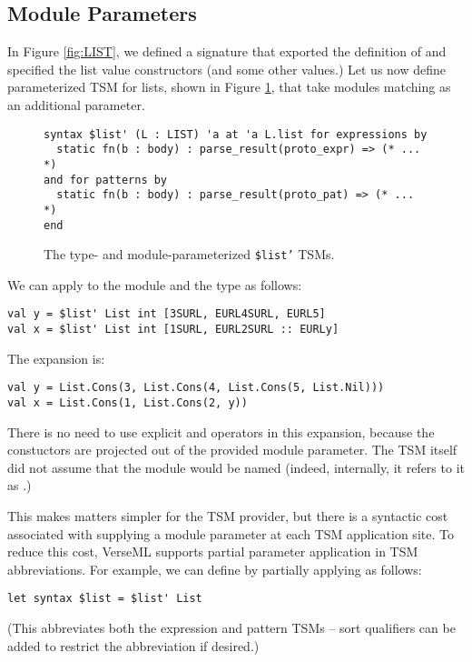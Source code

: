 \subsection{Module Parameters}\label{sec:module-parameters}
In Figure \ref{fig:LIST}, we defined a signature  that exported the definition of  and specified the list value constructors (and some other values.) Let us now define parameterized TSM for lists, shown in Figure \ref{fig:ptsm-listprime}, that take modules matching  as an additional parameter.

\begin{figure}[h]
\begin{lstlisting}[numbers=none]
syntax $list' (L : LIST) 'a at 'a L.list for expressions by 
  static fn(b : body) : parse_result(proto_expr) => (* ... *)
and for patterns by 
  static fn(b : body) : parse_result(proto_pat) => (* ... *)
end
\end{lstlisting}
\caption{The type- and module-parameterized \texttt{\$list'} TSMs.}
\label{fig:ptsm-listprime}
\end{figure}

We can apply  to the module  and the type  as follows:
\begin{lstlisting}[numbers=none]
val y = $list' List int [3SURL, EURL4SURL, EURL5]
val x = $list' List int [1SURL, EURL2SURL :: EURLy]
\end{lstlisting}
The expansion is:
\begin{lstlisting}[numbers=none]
val y = List.Cons(3, List.Cons(4, List.Cons(5, List.Nil)))
val x = List.Cons(1, List.Cons(2, y))
\end{lstlisting}
There is no need to use explicit  and  operators in this expansion, because the constuctors are projected out of the provided module parameter. The TSM itself did not assume that the module would be named  (indeed, internally, it refers to it as .)

This makes matters simpler for the TSM provider, but there is a syntactic cost associated with supplying a module parameter at each TSM application site. To reduce this cost, VerseML supports partial parameter application in TSM abbreviations. For example, we can define  by partially applying  as follows:
\begin{lstlisting}[numbers=none]
let syntax $list = $list' List
\end{lstlisting}
(This abbreviates both the expression and pattern TSMs -- sort qualifiers can be added to restrict the abbreviation if desired.)



